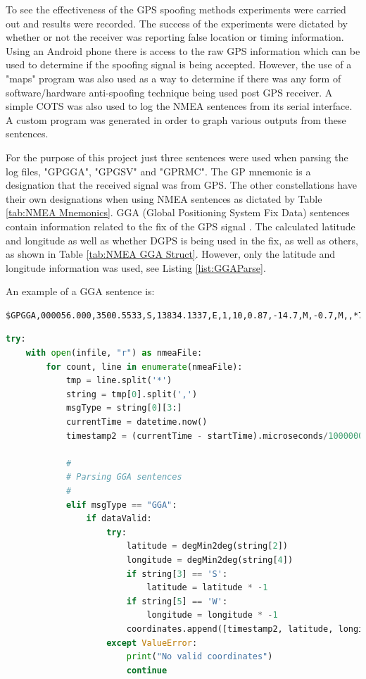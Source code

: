 To see the effectiveness of the GPS spoofing methods experiments were carried out and results were recorded. The success of the experiments were dictated by whether or
not the receiver was reporting false location or timing information. Using an Android phone there is access to the raw GPS information which can be used to determine if
the spoofing signal is being accepted. However, the use of a "maps" program was also used as a way to determine if there was any form of software/hardware anti-spoofing
technique being used post GPS receiver. A simple COTS was also used to log the NMEA sentences from its serial interface. A custom program was generated in order to graph
various outputs from these sentences.

For the purpose of this project just three sentences were used when parsing the log files, "GPGGA", "GPGSV" and "GPRMC". The GP mnemonic is a designation that the
received signal was from GPS. The other constellations have their own designations when using NMEA sentences as dictated by Table \ref{tab:NMEA Mnemonics}. 
GGA (Global Positioning System Fix Data) sentences contain information related to the fix of the
GPS signal \cite{RN71}. The calculated latitude and longitude as well as whether DGPS is being used in the fix, as well as others, as shown in Table \ref{tab:NMEA GGA Struct}.
However, only the latitude and longitude information was used, see Listing \ref{list:GGAParse}.

An example of a GGA sentence is:
\begin{verbatim}
$GPGGA,000056.000,3500.5533,S,13834.1337,E,1,10,0.87,-14.7,M,-0.7,M,,*74
\end{verbatim}

\begin{lstlisting}[language=Python, label=list:GGAParse, caption=Parsing GGA sentences for lattitue and longitude information]
try:
    with open(infile, "r") as nmeaFile:
        for count, line in enumerate(nmeaFile):
            tmp = line.split('*')
            string = tmp[0].split(',')
            msgType = string[0][3:]
            currentTime = datetime.now()
            timestamp2 = (currentTime - startTime).microseconds/1000000

            #
            # Parsing GGA sentences
            #
            elif msgType == "GGA":
                if dataValid:
                    try:
                        latitude = degMin2deg(string[2])
                        longitude = degMin2deg(string[4])
                        if string[3] == 'S':
                            latitude = latitude * -1
                        if string[5] == 'W':
                            longitude = longitude * -1
                        coordinates.append([timestamp2, latitude, longitude])
                    except ValueError:
                        print("No valid coordinates")
                        continue
\end{lstlisting}

